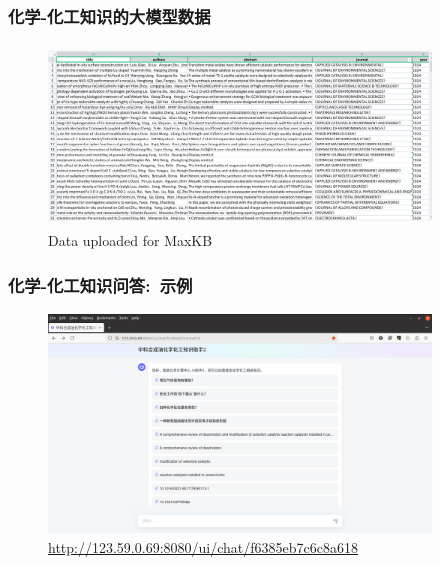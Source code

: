 \begin{frame}
	\frametitle{化学-化工知识的大模型数据}	
\begin{figure}[h!]
\centering
\includegraphics[height=1.90in,width=4.00in,viewport=0 0 1456 647,clip]{Figures/MaxKB_Info-2.png}
\caption{\tiny\textrm{Data uploaded for MaxKB}}%
\label{Fig:MaxKB_Data-2}
\end{figure}
\end{frame}

\begin{frame}
	\frametitle{化学-化工知识问答:~示例}	
\begin{figure}[h!]
\centering
\includegraphics[height=2.30in,width=4.00in,viewport=0 0 1528 875,clip]{Figures/MaxKB_Chem.png}
\caption{\tiny\textrm{\url{http://123.59.0.69:8080/ui/chat/f6385eb7c6c8a618}}}%
\label{Fig:MaxKB_Chem}
\end{figure}
\end{frame}

